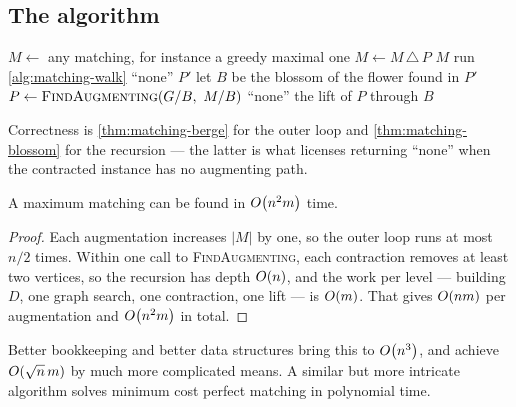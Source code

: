 \subsection{The algorithm}
\label{sec:matching-algorithm}

\begin{algorithm}[ht]
\caption{Edmonds' algorithm}
\label{alg:matching-edmonds}
\begin{algorithmic}[1]
  \State $M \gets$ any matching, for instance a greedy maximal one
     \State $M \gets M \,\triangle\, P$
  \EndWhile
  \State \Return $M$
  \Statex
     \State run \cref{alg:matching-walk}
      \Return ``none'' \EndIf
      \Return $P'$ \EndIf
     \State let $B$ be the blossom of the flower found in $P'$
     \State $P \gets \textsc{FindAugmenting}(G/B,\ M/B)$
      \Return ``none'' \EndIf
     \State \Return the lift of $P$ through $B$
  \EndFunction
\end{algorithmic}
\end{algorithm}

Correctness is \cref{thm:matching-berge} for the outer loop and
\cref{thm:matching-blossom} for the recursion --- the latter is what licenses
returning ``none'' when the contracted instance has no augmenting path.

\begin{theorem}\label{thm:matching-edmonds-time}
A maximum matching can be found in $O\!\left(n^2m\right)$ time.
\end{theorem}

\begin{proof}
Each augmentation increases $|M|$ by one, so the outer loop runs at most $n/2$
times. Within one call to \textsc{FindAugmenting}, each contraction removes at
least two vertices, so the recursion has depth $O\!\left(n\right)$, and the work per
level --- building $D$, one graph search, one contraction, one lift --- is
$O\!\left(m\right)$. That gives $O\!\left(nm\right)$ per augmentation and $O\!\left(n^2m\right)$ in
total.
\end{proof}

Better bookkeeping and better data structures bring this to $O\!\left(n^3\right)$, and
\citet{MicaliVazirani1980} achieve $O\!\left(\sqrt{n}\,m\right)$ by much more
complicated means. A similar but more intricate algorithm solves minimum cost
perfect matching in polynomial time.

